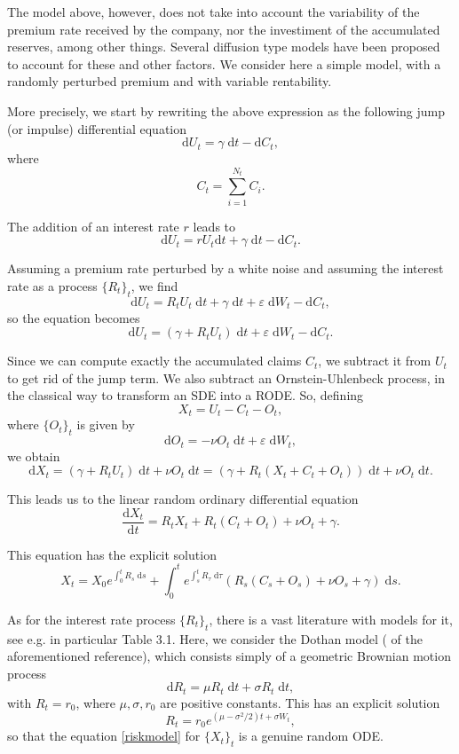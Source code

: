 \documentclass[reqno,12pt]{amsart}
\theoremstyle{plain} %
\theoremstyle{definition} %
\begin{document}
The model above, however, does not take into account the variability of the premium rate received by the company, nor the investiment of the accumulated reserves, among other things. Several diffusion type models have been proposed to account for these and other factors. We consider here a simple model, with a randomly perturbed premium and with variable rentability.

More precisely, we start by rewriting the above expression as the following jump (or impulse) differential equation
\[
  \mathrm{d}U_t = \gamma\;\mathrm{d}t - \mathrm{d}C_t,
\]
where
\[
  C_t = \sum_{i=1}^{N_t} C_i.
\]

The addition of an interest rate $r$ leads to
\[
  \mathrm{d}U_t = r U_t \mathrm{d}t + \gamma\;\mathrm{d}t - \mathrm{d}C_t.
\]

Assuming a premium rate perturbed by a white noise and assuming the interest rate as a process $\{R_t\}_t$, we find
\[
  \mathrm{d}U_t = R_t U_t\;\mathrm{d}t + \gamma\;\mathrm{d}t + \varepsilon\;\mathrm{d}W_t - \mathrm{d}C_t,
\]
so the equation becomes
\[
  \mathrm{d}U_t = (\gamma + R_t U_t)\;\mathrm{d}t + \varepsilon\;\mathrm{d}W_t - \mathrm{d}C_t.
\]

Since we can compute exactly the accumulated claims $C_t$, we subtract it from $U_t$ to get rid of the jump term. We also subtract an Ornstein-Uhlenbeck process, in the classical way to transform an SDE into a RODE. So, defining
\[
  X_t = U_t - C_t - O_t,
\]
where $\{O_t\}_t$ is given by
\[
  \mathrm{d}O_t = -\nu O_t\;\mathrm{d}t + \varepsilon\;\mathrm{d}W_t,
\]
we obtain
\[
  \mathrm{d}X_t = (\gamma + R_t U_t)\;\mathrm{d}t + \nu O_t\;\mathrm{d}t = (\gamma + R_t (X_t + C_t + O_t))\;\mathrm{d}t + \nu O_t\;\mathrm{d}t.
\]

This leads us to the linear random ordinary differential equation
\begin{equation}
    \label{riskmodel}
    \frac{\mathrm{d}X_t}{\mathrm{d}t} = R_t X_t + R_t (C_t + O_t) + \nu O_t + \gamma.
\end{equation}

This equation has the explicit solution
\[
  X_t = X_0 e^{\int_0^t R_s\;\mathrm{d}s} + \int_0^t e^{\int_s^t R_\tau\;\mathrm{d}\tau} (R_s (C_s + O_s) + \nu O_s + \gamma)\;\mathrm{d}s.
\]

As for the interest rate process $\{R_t\}_t$, there is a vast literature with models for it, see e.g. \cite[Chapter 3]{BrigoMercurio2006} in particular Table 3.1. Here, we consider the Dothan model (\cite[Section 3.2.2]{BrigoMercurio2006} of the aforementioned reference), which consists simply of a geometric Brownian motion process
\[
  \mathrm{d}R_t = \mu R_t \;\mathrm{d}t + \sigma R_t\;\mathrm{d}t,
\]
with $R_t = r_0$, where $\mu, \sigma, r_0$ are positive constants. This has an explicit solution
\[
  R_t = r_0 e^{(\mu - \sigma^2/2)t + \sigma W_t},
\]
so that the equation \cref{riskmodel} for $\{X_t\}_t$ is a genuine random ODE.
\end{document}
